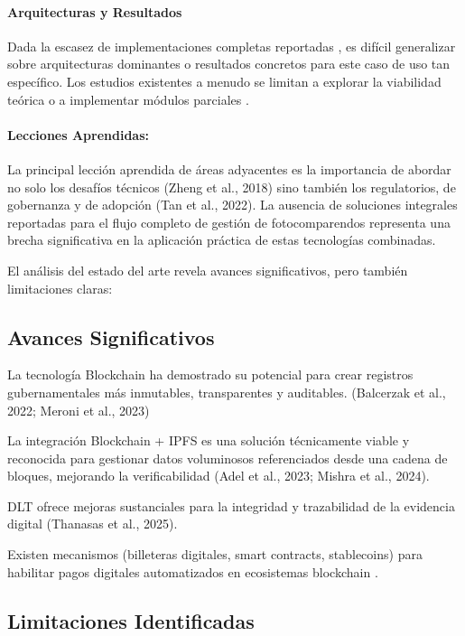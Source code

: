 \paragraph{Arquitecturas y Resultados} Dada la escasez de implementaciones completas reportadas \parencite{AnandSingh_ProjectReport_Year,juit2024traffic}, es difícil generalizar sobre arquitecturas dominantes o resultados concretos para este caso de uso tan específico. Los estudios existentes a menudo se limitan a explorar la viabilidad teórica o a implementar módulos parciales \parencite{choquevilca2024blockchain}.

\paragraph{Lecciones Aprendidas:} La principal lección aprendida de áreas adyacentes es la importancia de abordar no solo los desafíos técnicos (Zheng et al., 2018) sino también los regulatorios, de gobernanza y de adopción (Tan et al., 2022). La ausencia de soluciones integrales reportadas para el flujo completo de gestión de fotocomparendos representa una brecha significativa en la aplicación práctica de estas tecnologías combinadas.

El análisis del estado del arte revela avances significativos, pero también limitaciones claras: 
  

\subsection{Avances Significativos} 

La tecnología Blockchain ha demostrado su potencial para crear registros gubernamentales más inmutables, transparentes y auditables. (Balcerzak et al., 2022; Meroni et al., 2023) 

La integración Blockchain + IPFS es una solución técnicamente viable y reconocida para gestionar datos voluminosos referenciados desde una cadena de bloques, mejorando la verificabilidad (Adel et al., 2023; Mishra et al., 2024). 

DLT ofrece mejoras sustanciales para la integridad y trazabilidad de la evidencia digital (Thanasas et al., 2025). 

Existen mecanismos (billeteras digitales, smart contracts, stablecoins) para habilitar pagos digitales automatizados en ecosistemas blockchain \parencite{antonopoulos2023mastering}.

\subsection{Limitaciones Identificadas} 
